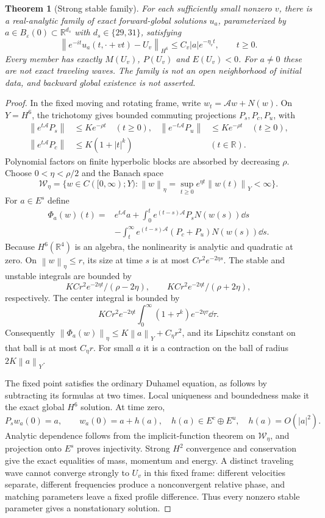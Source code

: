 \documentclass[11pt,a4paper]{article}
\newtheorem{theorem}{Theorem}[section]
\theoremstyle{remark}\newtheorem{remark}[theorem]{Remark}
\newcommand{\R}{\mathbb R}\newcommand{\C}{\mathbb C}
\newcommand{\norm}[1]{\left\|#1\right\|}
\begin{document}
\begin{theorem}[Strong stable family]\label{thm:stable}
For each sufficiently small nonzero $v$, there is a real-analytic family of exact forward-global solutions $u_a$, parameterized by $a\in B_\varepsilon(0)\subset\R^{d_s}$ with $d_s\in\{29,31\}$, satisfying
\[
 \norm{e^{-it}u_a(t,\cdot+vt)-U_v}_{H^6}
 \le C_v|a|e^{-\eta_vt},\qquad t\ge0.
\]
Every member has exactly $M(U_v)$, $P(U_v)$ and $E(U_v)<0$. For $a\ne0$ these are not exact traveling waves. The family is not an open neighborhood of initial data, and backward global existence is not asserted.
\end{theorem}
\begin{proof}
In the fixed moving and rotating frame, write $w_t=\mathcal Aw+N(w)$. On $Y=H^6$, the trichotomy gives bounded commuting projections $P_s,P_c,P_u$, with
\begin{align*}
 \norm{e^{t\mathcal A}P_s}&\le Ke^{-\rho t}\quad(t\ge0),&
 \norm{e^{-t\mathcal A}P_u}&\le Ke^{-\rho t}\quad(t\ge0),\\
 \norm{e^{t\mathcal A}P_c}&\le K(1+|t|^k)&& (t\in\R).
\end{align*}
Polynomial factors on finite hyperbolic blocks are absorbed by decreasing $\rho$. Choose $0<\eta<\rho/2$ and the Banach space
\[
 \mathcal W_\eta=\{w\in C([0,\infty);Y):
 \norm w_\eta=\sup_{t\ge0}e^{\eta t}\norm{w(t)}_Y<\infty\}.
\]
For $a\in E^s$ define
\begin{align*}
 \Phi_a(w)(t)={}&e^{t\mathcal A}a
 +\int_0^te^{(t-s)\mathcal A}P_sN(w(s))\dd s\\
 &-\int_t^\infty e^{(t-s)\mathcal A}(P_c+P_u)N(w(s))\dd s.
\end{align*}
Because $H^6(\R^4)$ is an algebra, the nonlinearity is analytic and quadratic at zero. On $\norm w_\eta\le r$, its size at time $s$ is at most $Cr^2e^{-2\eta s}$. The stable and unstable integrals are bounded by
\[
 KCr^2e^{-2\eta t}/(\rho-2\eta),\qquad
 KCr^2e^{-2\eta t}/(\rho+2\eta),
\]
respectively. The center integral is bounded by
\[
 KCr^2e^{-2\eta t}\int_0^\infty(1+\tau^k)e^{-2\eta\tau}\dd\tau.
\]
Consequently $\norm{\Phi_a(w)}_\eta\le K\norm a_Y+C_\eta r^2$, and its Lipschitz constant on that ball is at most $C_\eta r$. For small $a$ it is a contraction on the ball of radius $2K\norm a_Y$.

The fixed point satisfies the ordinary Duhamel equation, as follows by subtracting its formulas at two times. Local uniqueness and boundedness make it the exact global $H^6$ solution. At time zero,
\[
 P_sw_a(0)=a,\qquad w_a(0)=a+h(a),\quad h(a)\in E^c\oplus E^u,
 \quad h(a)=O(|a|^2).
\]
Analytic dependence follows from the implicit-function theorem on $\mathcal W_\eta$, and projection onto $E^s$ proves injectivity. Strong $H^2$ convergence and conservation give the exact equalities of mass, momentum and energy. A distinct traveling wave cannot converge strongly to $U_v$ in this fixed frame: different velocities separate, different frequencies produce a nonconvergent relative phase, and matching parameters leave a fixed profile difference. Thus every nonzero stable parameter gives a nonstationary solution.
\end{proof}
\end{document}
